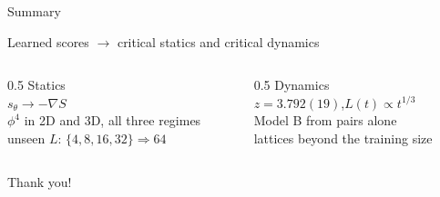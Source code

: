 \documentclass[11pt,t]{beamer}
\begin{document}
\begin{frame}[c]{Summary}
  \relax %
  {\centering\large Learned scores $\longrightarrow$ critical statics and critical dynamics\par}
  \vspace{1.4em}
  \begin{columns}[T,onlytextwidth]
    \begin{column}{0.5\textwidth}
      \centering
      {\small Statics}\\[0.5em]
      {\alert{\large $s_\theta\to-\nabla S$}}\\[0.6em]
      {\small $\phi^4$ in 2D and 3D, all three regimes\\ unseen $L$: $\{4,8,16,32\}\Rightarrow64$}
    \end{column}
    \begin{column}{0.5\textwidth}
      \centering
      {\small Dynamics}\\[0.5em]
      {\alert{\large $z=3.792(19)$,\quad $L(t)\propto t^{1/3}$}}\\[0.6em]
      {\small Model B from pairs alone\\ lattices beyond the training size}
    \end{column}
  \end{columns}
  \vspace{2.6em}
  {\centering
    {\large Thank you!}\par}
\end{frame}
\end{document}
